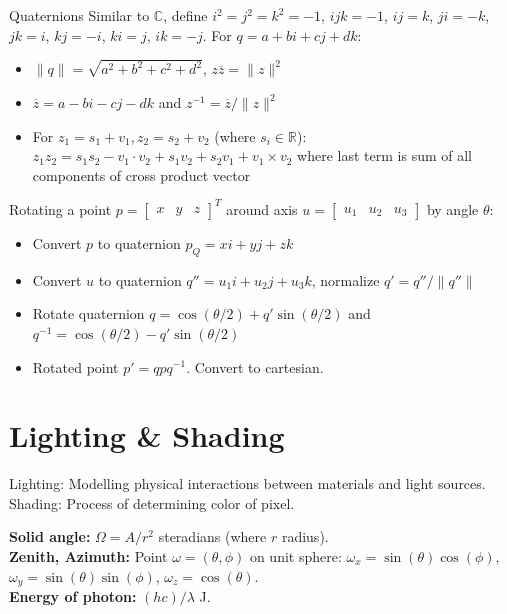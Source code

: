 \documentclass[a4paper,9pt]{article}
\begin{document}
\begin{subbox}{Quaternions}
Similar to $\mathbb{C}$, define $i^2 = j^2 = k^2 = - 1$, $i j k = -1$, $i j = k$, $j i = -k$, $j k = i$, $k j = -i$, $k i = j$, $i k = -j$. For $q = a + b i + c j + d k$:
\begin{itemize}
  \item $\|q\| = \sqrt{a^2 + b^2 + c^2 + d^2}$, $z \overline{z} = \|z\|^2$
  \item $\overline{z} = a - b i - c j - d k$ and $z^{-1} = \overline{z} / \|z\|^2$
  \item For $z_1 = s_1 + v_1, z_2 = s_2 + v_2$ (where $s_i \in \mathbb{R}$): $z_1 z_2 = s_1 s_2 - v_1 \cdot v_2 + s_1 v_2 + s_2 v_1 + v_1 \times v_2$ where last term is sum of all components of cross product vector
\end{itemize}
Rotating a point $p = \begin{bmatrix} x & y & z \end{bmatrix}^T$ around axis $u = \begin{bmatrix} u_1 & u_2 & u_3 \end{bmatrix}$ by angle $\theta$:
\begin{itemize}
  \item Convert $p$ to quaternion $p_Q = x i + y j + z k$
  \item Convert $u$ to quaternion $q'' = u_1 i + u_2 j + u_3 k$, normalize $q' = q'' / \|q''\|$
  \item Rotate quaternion $q = \cos(\theta/2) + q' \sin(\theta/2)$ and $q^{-1} = \cos(\theta/2) - q' \sin(\theta/2)$
  \item Rotated point $p' = q p q^{-1}$. Convert to cartesian.
\end{itemize}
\end{subbox}
\section{Lighting \& Shading}
Lighting: Modelling physical interactions between materials and light sources.\\
Shading: Process of determining color of pixel.

\textbf{Solid angle:} $\Omega = A / r^2$ steradians (where $r$ radius).\\
\textbf{Zenith, Azimuth:} Point $\omega = (\theta, \phi)$ on unit sphere: $\omega_x = \sin(\theta) \cos(\phi)$, $\omega_y = \sin(\theta) \sin(\phi)$, $\omega_z = \cos(\theta)$.\\
\textbf{Energy of photon:} $(h c) / \lambda$ J.
\end{document}
